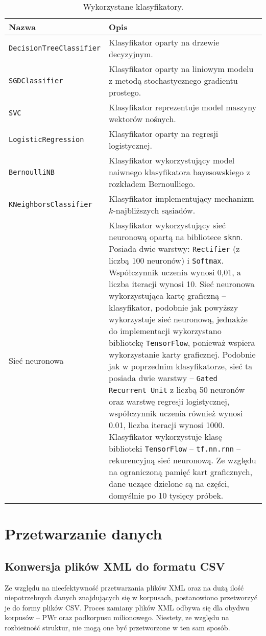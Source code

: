 	\begin{table}[ht!]
		\centering
		\caption{Wykorzystane klasyfikatory.}
		\begin{tabular}{p{5cm}p{11cm}}
			\toprule
			\textbf{Nazwa} & \textbf{Opis} \\
			\midrule
			\texttt{DecisionTreeClassifier} & Klasyfikator oparty na drzewie decyzyjnym. \\
			\texttt{SGDClassifier} & Klasyfikator oparty na liniowym modelu z metodą stochastycznego gradientu prostego. \\
			\texttt{SVC} & Klasyfikator reprezentuje model maszyny wektorów nośnych. \\
			\texttt{LogisticRegression} & Klasyfikator oparty na regresji logistycznej. \\
			\texttt{BernoulliNB} & Klasyfikator wykorzystujący model naiwnego klasyfikatora bayesowskiego z rozkładem Bernoulliego. \\
			\texttt{KNeighborsClassifier} & Klasyfikator implementujący mechanizm $k$-najbliższych sąsiadów. \\
			Sieć neuronowa & Klasyfikator wykorzystujący sieć neuronową opartą na bibliotece \texttt{sknn}. Posiada dwie warstwy: \texttt{Rectifier} (z liczbą 100 neuronów) i \texttt{Softmax}. Współczynnik uczenia wynosi 0,01, a liczba iteracji wynosi 10.
			Sieć neuronowa wykorzystująca kartę graficzną -- klasyfikator, podobnie jak powyższy wykorzystuje sieć neuronową, jednakże do implementacji wykorzystano bibliotekę \texttt{TensorFlow}, ponieważ wspiera wykorzystanie karty graficznej. Podobnie jak w poprzednim klasyfikatorze, sieć ta posiada dwie warstwy -- \texttt{Gated Recurrent Unit} z liczbą 50 neuronów oraz warstwę regresji logistycznej, współczynnik uczenia również wynosi 0.01, liczba iteracji wynosi 1000. Klasyfikator wykorzystuje klasę biblioteki \texttt{TensorFlow} -- \texttt{tf.nn.rnn} -- rekurencyjną sieć neuronową. Ze względu na ograniczoną pamięć kart graficznych, dane uczące dzielone są na części, domyślnie po 10 tysięcy próbek. \\
			\bottomrule
		\end{tabular}
	\end{table}
	
	\section{Przetwarzanie danych}
	\subsection{Konwersja plików XML do formatu CSV}
	Ze względu na nieefektywność przetwarzania plików XML oraz na dużą ilość niepotrzebnych danych znajdujących się w korpusach, postanowiono przetworzyć je do formy plików CSV.
Proces zamiany plików XML odbywa się dla obydwu korpusów -- PWr oraz podkorpusu milionowego.
	Niestety, ze względu na rozbieżność struktur, nie mogą one być przetworzone w ten sam sposób.
	
